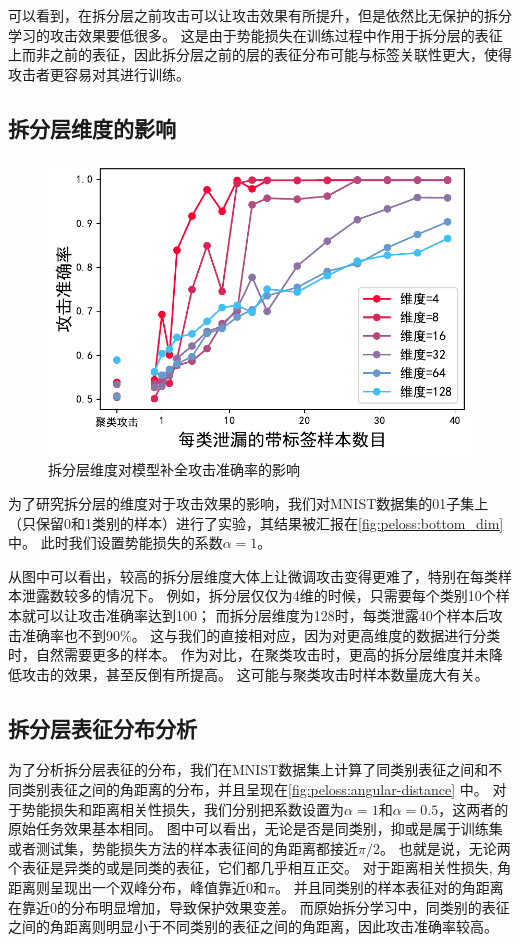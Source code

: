 可以看到，在拆分层之前攻击可以让攻击效果有所提升，但是依然比无保护的拆分学习的攻击效果要低很多。
%
这是由于势能损失在训练过程中作用于拆分层的表征上而非之前的表征，因此拆分层之前的层的表征分布可能与标签关联性更大，使得攻击者更容易对其进行训练。

\subsection{拆分层维度的影响}
\begin{figure}[h!]
    \centering
    \includegraphics[width=0.7\linewidth]{Z_Resources/peloss_mnist-subclass2}
    \caption{拆分层维度对模型补全攻击准确率的影响}
    \label{fig:peloss:bottom_dim}
\end{figure}

为了研究拆分层的维度对于攻击效果的影响，我们对MNIST数据集的01子集上（只保留0和1类别的样本）进行了实验，其结果被汇报在\autoref{fig:peloss:bottom_dim}中。
此时我们设置势能损失的系数$\alpha=1$。

从图中可以看出，较高的拆分层维度大体上让微调攻击变得更难了，特别在每类样本泄露数较多的情况下。
%
例如，拆分层仅仅为4维的时候，只需要每个类别10个样本就可以让攻击准确率达到100；
而拆分层维度为128时，每类泄露40个样本后攻击准确率也不到90\%。
这与我们的直接相对应，因为对更高维度的数据进行分类时，自然需要更多的样本。
%
作为对比，在聚类攻击时，更高的拆分层维度并未降低攻击的效果，甚至反倒有所提高。
这可能与聚类攻击时样本数量庞大有关。



\subsection{拆分层表征分布分析}

为了分析拆分层表征的分布，我们在MNIST数据集上计算了同类别表征之间和不同类别表征之间的角距离的分布，并且呈现在\autoref{fig:peloss:angular-distance} 中。
%
对于势能损失和距离相关性损失，我们分别把系数设置为$\alpha=1$和$\alpha=0.5$，这两者的原始任务效果基本相同。
%
图中可以看出，无论是否是同类别，抑或是属于训练集或者测试集，势能损失方法的样本表征间的角距离都接近$\pi/2$。
也就是说，无论两个表征是异类的或是同类的表征，它们都几乎相互正交。
%
对于距离相关性损失, 角距离则呈现出一个双峰分布，峰值靠近$0$和$\pi$。
并且同类别的样本表征对的角距离在靠近0的分布明显增加，导致保护效果变差。
%
而原始拆分学习中，同类别的表征之间的角距离则明显小于不同类别的表征之间的角距离，因此攻击准确率较高。


